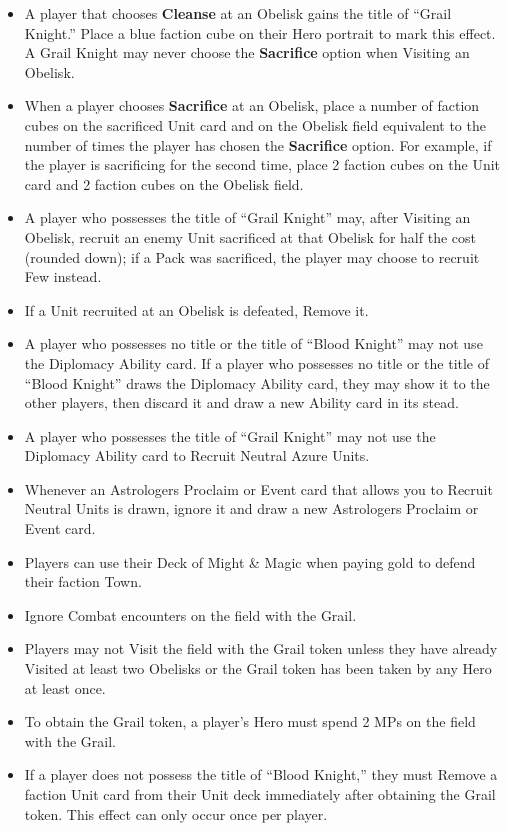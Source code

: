\begin{multicols*}{2}
\begin{itemize}
  \item A player that chooses \textbf{Cleanse} at an Obelisk gains the title of ``\textcolor{cobalt}{Grail Knight}.'' Place a blue faction cube on their Hero portrait to mark this effect. A \textcolor{cobalt}{Grail Knight} may never choose the \textbf{Sacrifice} option when Visiting an Obelisk.
  \item When a player chooses \textbf{Sacrifice} at an Obelisk, place a number of faction cubes on the sacrificed Unit card and on the Obelisk field equivalent to the number of times the player has chosen the \textbf{Sacrifice} option. For example, if the player is sacrificing for the second time, place 2 faction cubes on the Unit card and 2 faction cubes on the Obelisk field.
  \item A player who possesses the title of ``\textcolor{cobalt}{Grail Knight}'' may, after Visiting an Obelisk, recruit an enemy Unit sacrificed at that Obelisk for half the cost (rounded down); if a Pack was sacrificed, the player may choose to recruit Few instead.
  \item If a Unit recruited at an Obelisk is defeated, Remove it.
  \item A player who possesses no title or the title of ``\textcolor{darkcandyapplered}{Blood Knight}'' may not use the Diplomacy Ability card. If a player who possesses no title or the title of ``\textcolor{darkcandyapplered}{Blood Knight}'' draws the Diplomacy Ability card, they may show it to the other players, then discard it and draw a new Ability card in its stead.
  \item A player who possesses the title of ``\textcolor{cobalt}{Grail Knight}'' may not use the Diplomacy Ability card to Recruit Neutral Azure Units.
  \item Whenever an Astrologers Proclaim or Event card that allows you to Recruit Neutral Units is drawn, ignore it and draw a new Astrologers Proclaim or Event card.
  \item Players can use their Deck of Might \& Magic when paying gold to defend their faction Town.
  \item Ignore Combat encounters on the field with the Grail.
  \item Players may not Visit the field with the Grail token unless they have already Visited at least two Obelisks or the Grail token has been taken by any Hero at least once.
  \item To obtain the Grail token, a player’s Hero must spend 2 MPs on the field with the Grail.
  \item If a player does not possess the title of ``\textcolor{darkcandyapplered}{Blood Knight},'' they must Remove a faction Unit card from their Unit deck immediately after obtaining the Grail token. This effect can only occur once per player.

\end{itemize}
\end{multicols*}
